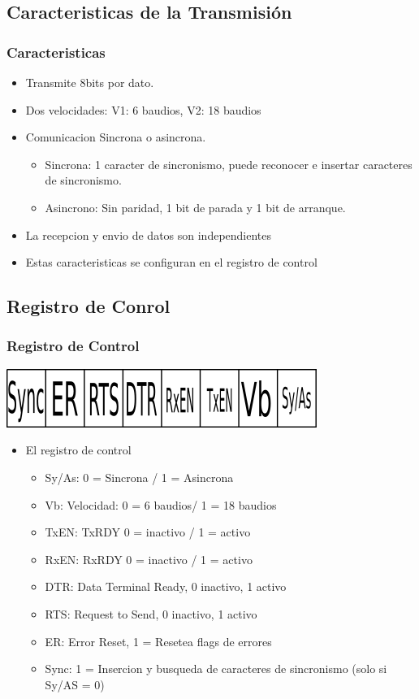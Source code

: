 \documentclass{beamer}
\begin{document}
\subsection{Caracteristicas de la Transmisión}
\begin{frame}
\frametitle{Caracteristicas}
\begin{itemize}
 \item Transmite 8bits por dato.
 \item Dos velocidades: V1: 6 baudios, V2: 18 baudios
 \item Comunicacion Sincrona o asincrona.
  \begin{itemize}
   \item Sincrona: 1 caracter de sincronismo, puede reconocer e insertar caracteres de sincronismo.
   \item Asincrono: Sin paridad, 1 bit de parada y 1 bit de arranque.
  \end{itemize}
 \item La recepcion y envio de datos son independientes
 \item Estas caracteristicas se configuran en el registro de control
\end{itemize}
\end{frame}

\subsection{Registro de Conrol}
\begin{frame}
\frametitle{Registro de Control}
\begin{center}
 \includegraphics[scale=0.50]{usart-ctrl.png}
\end{center}

\begin{itemize}
 \item El registro de control 
 \begin{itemize}
   \item Sy/As: 0 = Sincrona / 1 = Asincrona
   \item Vb: Velocidad: 0 = 6 baudios/ 1 = 18 baudios
   \item TxEN: TxRDY 0 = inactivo / 1 = activo
   \item RxEN: RxRDY 0 = inactivo / 1 = activo
   \item DTR: Data Terminal Ready, 0 inactivo, 1 activo
   \item RTS: Request to Send, 0 inactivo, 1 activo
   \item ER: Error Reset, 1 = Resetea flags de errores
   \item Sync: 1 = Insercion y busqueda de caracteres de sincronismo (solo si Sy/AS = 0)
  \end{itemize}
\end{itemize}
\end{frame}
\end{document}
